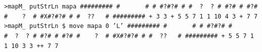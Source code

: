 \documentclass[a4paper]{article}
\begin{document}
\texttt{>mapM\_ putStrLn  mapa
        \linebreak \#\#\#\#\#\#\#\#\#
        \linebreak \# \ \  \ \ \ \ \#
        \linebreak \# \#?\#?\# \#
        \linebreak \#\ \ ?\ \ ?\ \#
        \linebreak \#?\# \# \#?\#
        \linebreak \#\ \ \ \ ?\ \ \#
        \linebreak \#X\#?\#?\# \#
        \linebreak \# \ ??\ \ \ \#
        \linebreak \#\#\#\#\#\#\#\#\#
        \linebreak + 3 3
        \linebreak + 5 5
         7 1 1 10
         4 3 +
         7 7 
        \linebreak 
        \linebreak
        >mapM\_ putStrLn \$ move mapa 0 'L'
        \linebreak \#\#\#\#\#\#\#\#\#
        \linebreak \# \ \  \ \ \ \ \#
        \linebreak \# \#?\#?\# \#
        \linebreak \#\ \ ?\ \ ?\ \#
        \linebreak \#?\# \# \#?\#
        \linebreak \#\ \ \ \ ?\ \ \#
        \linebreak \#X\#?\#?\# \#
        \linebreak \# \ ??\ \ \ \#
        \linebreak \#\#\#\#\#\#\#\#\#
        \linebreak + 5 5
         7 1 1 10
         3 3 ++
         7 7 
        \linebreak  }    
    
\pagebreak
\end{document}
